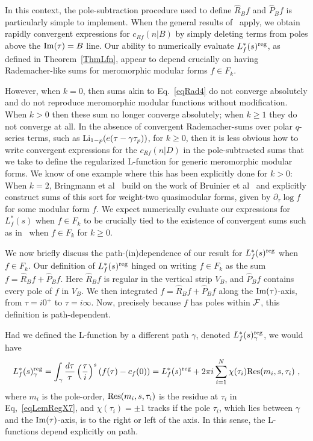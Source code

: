 \documentclass[11pt,a4paper]{article}
\newcommand{\g}{\gamma}
\def\d{\partial}
\newcommand{\reg}{{\rm reg}}
\newcommand{\PF}{\widehat{P}} 				%
\newcommand{\RF}{\widehat{R}} 				%
\begin{document}
In this context, the pole-subtraction procedure used to define $\RF_B f$ and $\PF_B f$ is particularly simple to implement. When the general results of~\cite{19-KolnPol1, 20-KolnPol2} apply, we obtain rapidly convergent expressions for $c_{Rf}(n|B)$ by simply deleting terms from poles above the ${\rm Im}(\tau) = B$ line. Our ability to numerically evaluate $L_f^*(s)^\reg$, as defined in Theorem~\ref{ThmLfn}, appear to depend crucially on having Rademacher-like sums for meromorphic modular forms $f \in F_k$.

However, when $k = 0$, then sums akin to Eq.~\eqref{eqRad4} do not converge absolutely and do not reproduce meromorphic modular functions without modification. When $k > 0$ then these sum no longer converge absolutely; when $k \geq 1$ they do not converge at all. In the absence of convergent Rademacher-sums over polar $q$-series terms, such as ${\rm Li}_{1-p}(e(\tau - \g\tau_p))$, for $k \geq 0$, then it is less obvious how to write convergent expressions for the $c_{Rf}(n|D)$ in the pole-subtracted sums that we take to define the regularized L-function for generic meromorphic modular forms. We know of one example where this has been explicitly done for $k > 0$: When $k = 2$, Bringmann et al~\cite{21-DivisorsMF1} build on the work of Bruinier et al~\cite{22-DivisorsMF2} and explicitly construct sums of this sort for weight-two quasimodular forms, given by $\d_\tau \log f$ for some modular form $f$. We expect numerically evaluate our expressions for $L^*_f(s)$ when $f \in F_k$ to be crucially tied to the existence of convergent sums such as in~\cite{21-DivisorsMF1} when $f \in F_k$ for $k \geq 0$. 

We now briefly discuss the path-(in)dependence of our result for $L_f^*(s)^\reg$ when $f \in F_k$. Our definition of $L_f^*(s)^\reg$ hinged on writing $f \in F_k$ as the sum $f = \RF_B f + \PF_B f$. Here $\RF_B f$ is regular in the vertical strip $V_B$, and $\PF_B f$ contains every pole of $f$ in $V_B$. We then integrated $f = \RF_B f + \PF_B f$ along the ${\rm Im}(\tau)$-axis, from $\tau = i 0^+$ to $\tau = i \infty$. Now, precisely because $f$ has poles within ${\cal F}$, this definition is path-dependent. 

Had we defined the L-function by a different path $\g$, denoted $L_f^*(s)^\reg_{\g}$, we would have
\begin{align}
L_f^*(s)^\reg_{\g} = \int_{\g} \frac{d\tau}{\tau} \left( \frac{\tau}{i} \right)^s (f(\tau) - c_f(0)) = L_f^*(s)^\reg + 2\pi i \sum_{i = 1}^N \chi(\tau_i) {\rm Res}(m_i,s,\tau_i)~,
\end{align}
where $m_i$ is the pole-order, ${\rm Res}(m_i,s,\tau_i)$ is the residue at $\tau_i$ in Eq,~\eqref{eqLemRegX7}, and $\chi(\tau_i) = \pm1$ tracks if the pole $\tau_i$, which lies between $\g$ and the ${\rm Im}(\tau)$-axis, is to the right or left of the axis. In this sense, the L-functions depend explicitly on path. 
\end{document}
